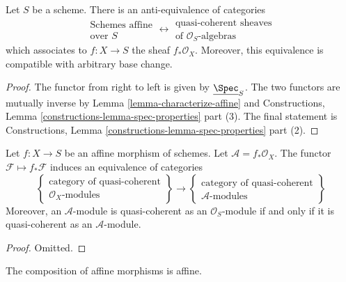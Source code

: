 \begin{lemma}
\label{lemma-affine-equivalence-algebras}
Let $S$ be a scheme. There is an anti-equivalence of categories
$$
\begin{matrix}
\text{Schemes affine} \\
\text{over }S
\end{matrix}
\longleftrightarrow
\begin{matrix}
\text{quasi-coherent sheaves} \\
\text{of }\mathcal{O}_S\text{-algebras}
\end{matrix}
$$
which associates to $f : X \to S$ the sheaf $f_*\mathcal{O}_X$.
Moreover, this equivalence is compatible with arbitrary base change.
\end{lemma}

\begin{proof}
The functor from right to left is given by $\underline{\Spec}_S$.
The two functors are mutually inverse by
Lemma \ref{lemma-characterize-affine} and
Constructions, Lemma \ref{constructions-lemma-spec-properties} part (3).
The final statement is
Constructions, Lemma \ref{constructions-lemma-spec-properties} part (2).
\end{proof}

\begin{lemma}
\label{lemma-affine-equivalence-modules}
Let $f : X \to S$ be an affine morphism of schemes.
Let $\mathcal{A} = f_*\mathcal{O}_X$.
The functor $\mathcal{F} \mapsto f_*\mathcal{F}$ induces
an equivalence of categories
$$
\left\{
\begin{matrix}
\text{category of quasi-coherent}\\
\mathcal{O}_X\text{-modules}
\end{matrix}
\right\}
\longrightarrow
\left\{
\begin{matrix}
\text{category of quasi-coherent}\\
\mathcal{A}\text{-modules}
\end{matrix}
\right\}
$$
Moreover, an $\mathcal{A}$-module is
quasi-coherent as an $\mathcal{O}_S$-module if and only if
it is quasi-coherent as an $\mathcal{A}$-module.
\end{lemma}

\begin{proof}
Omitted.
\end{proof}

\begin{lemma}
\label{lemma-composition-affine}
The composition of affine morphisms is affine.
\end{lemma}

